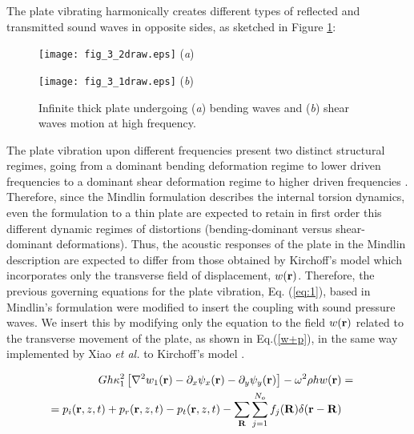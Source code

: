 \documentclass[a4paper]{ICEDyn}
\begin{document}
	The plate vibrating harmonically creates different types of reflected and transmitted sound waves in opposite sides, as sketched in Figure \ref{fig:3}: 
	\begin{figure}
		\begin{minipage} {.50\linewidth}
		\centering 
		\texttt{[image: fig\_3\_2draw.eps]}
		{(\textit{a})}%
		\end{minipage}\hfill
		\begin{minipage}{.50\linewidth}
		\centering
		\texttt{[image: fig\_3\_1draw.eps]}
		{(\textit{b})} %
		\end{minipage}\hfill
		\caption{Infinite thick plate undergoing (\textit{a}) bending waves and (\textit{b}) shear waves motion at high frequency.}
		\label{fig:3}
	\end{figure}
    
The plate vibration upon different frequencies present two distinct structural regimes, going from a dominant bending deformation regime to lower driven frequencies to a dominant shear deformation regime to higher driven frequencies \cite{Hambric}. Therefore, since the Mindlin formulation describes the internal torsion dynamics, even the formulation to a thin plate are expected to retain in first order this different dynamic regimes of distortions (bending-dominant versus shear-dominant deformations). Thus, the acoustic responses of the plate in the Mindlin description are expected to differ from those obtained by Kirchoff's model which incorporates only the transverse field of displacement, $w({\bf r})$.
Therefore, the previous governing equations for the plate vibration, Eq. (\ref{eq:1}), based in  Mindlin's formulation were modified to insert the coupling with sound pressure waves. We insert this by modifying only the equation to the field $w({\bf r})$ related to the transverse movement of the plate, as shown in Eq.(\ref{w+p}), in the same way implemented by Xiao {\it et al.} to Kirchoff's model \cite{Xiao2012s}. 
	
	\begin{eqnarray}
	Gh\kappa_{1}^{2}\left [\nabla^2 w_1({\bf r}) - \partial_x\psi_x({\bf r}) -\partial_y\psi_y({\bf r}) \right ]-\omega^2\rho h  w({\bf r}) &=&\nonumber\\ 
    =p_{i}({\bf r},z,t)+ p_{r}({\bf r},z,t)-p_{t}({\bf r},z,t) - \sum_{{\bf R}}\sum_{j=1}^{N_o}f_{j}({\bf R})\delta({ \bf r}-{ \bf R}) \label{w+p}
	\end{eqnarray}
	
\end{document}
